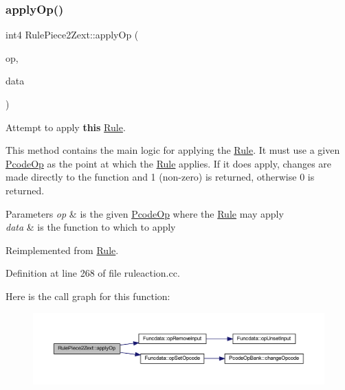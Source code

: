 \subsubsection{\texorpdfstring{applyOp()}{applyOp()}}
{\footnotesize\ttfamily int4 Rule\+Piece2\+Zext\+::apply\+Op (\begin{DoxyParamCaption}\item[{\mbox{\hyperlink{class_pcode_op}{Pcode\+Op}} $\ast$}]{op,  }\item[{\mbox{\hyperlink{class_funcdata}{Funcdata}} \&}]{data }\end{DoxyParamCaption})\hspace{0.3cm}{\ttfamily [virtual]}}



Attempt to apply {\bfseries{this}} \mbox{\hyperlink{class_rule}{Rule}}. 

This method contains the main logic for applying the \mbox{\hyperlink{class_rule}{Rule}}. It must use a given \mbox{\hyperlink{class_pcode_op}{Pcode\+Op}} as the point at which the \mbox{\hyperlink{class_rule}{Rule}} applies. If it does apply, changes are made directly to the function and 1 (non-\/zero) is returned, otherwise 0 is returned. 
\begin{DoxyParams}{Parameters}
{\em op} & is the given \mbox{\hyperlink{class_pcode_op}{Pcode\+Op}} where the \mbox{\hyperlink{class_rule}{Rule}} may apply \\
\hline
{\em data} & is the function to which to apply \\
\hline
\end{DoxyParams}


Reimplemented from \mbox{\hyperlink{class_rule_a4e3e61f066670175009f60fb9dc60848}{Rule}}.



Definition at line 268 of file ruleaction.\+cc.

Here is the call graph for this function\+:
\nopagebreak
\begin{figure}[H]
\begin{center}
\leavevmode
\includegraphics[width=350pt]{class_rule_piece2_zext_aa879d79ce26d031791b5ae7a11908701_cgraph}
\end{center}
\end{figure}
\mbox{\label{class_rule_piece2_zext_ad383e6fe63af0ef65f4c9d5204e39dd5}} 
